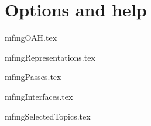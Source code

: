 \documentclass[11pt,a4paper]{report}
\begin{document}
\part{Options and help}

{mfmgOAH.tex}



{mfmgRepresentations.tex}



{mfmgPasses.tex}



{mfmgInterfaces.tex}



{mfmgSelectedTopics.tex}


\end{document}
